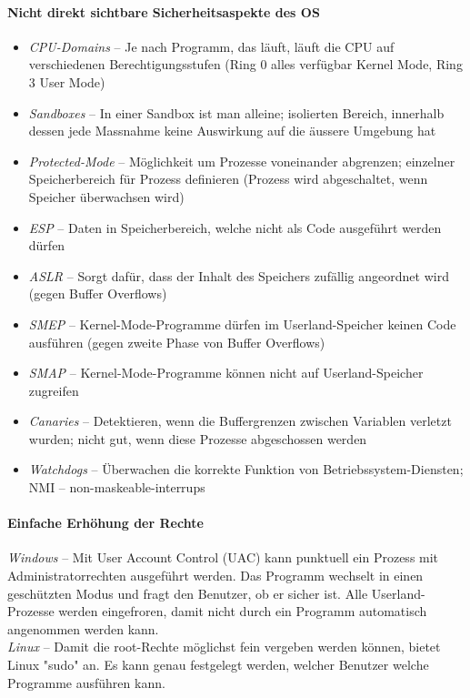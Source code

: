 \documentclass[a4paper,12pt]{article}
\begin{document}
\paragraph{Nicht direkt sichtbare Sicherheitsaspekte des OS}
\begin{itemize}
\item \emph{CPU-Domains} -- Je nach Programm, das läuft, läuft die CPU auf verschiedenen Berechtigungsstufen (Ring 0 alles verfügbar Kernel Mode, Ring 3 User Mode)
\item \emph{Sandboxes} -- In einer Sandbox ist man alleine; isolierten Bereich, innerhalb dessen jede Massnahme keine Auswirkung auf die äussere Umgebung hat
\item \emph{Protected-Mode} -- Möglichkeit um Prozesse voneinander abgrenzen; einzelner Speicherbereich für Prozess definieren (Prozess wird abgeschaltet, wenn Speicher überwachsen wird)
\item \emph{ESP} -- Daten in Speicherbereich, welche nicht als Code ausgeführt werden dürfen
\item \emph{ASLR} -- Sorgt dafür, dass der Inhalt des Speichers zufällig angeordnet wird (gegen Buffer Overflows)
\item \emph{SMEP} -- Kernel-Mode-Programme dürfen im Userland-Speicher keinen Code ausführen (gegen zweite Phase von Buffer Overflows)
\item \emph{SMAP} -- Kernel-Mode-Programme können nicht auf Userland-Speicher zugreifen
\item \emph{Canaries} -- Detektieren, wenn die Buffergrenzen zwischen Variablen verletzt wurden; nicht gut, wenn diese Prozesse abgeschossen werden
\item \emph{Watchdogs} -- Überwachen die korrekte Funktion von Betriebssystem-Diensten; NMI -- non-maskeable-interrups
\end{itemize}


\paragraph{Einfache Erhöhung der Rechte}
\emph{Windows} -- Mit User Account Control (UAC) kann punktuell ein Prozess mit Administratorrechten ausgeführt werden. Das Programm wechselt in einen geschützten Modus und fragt den Benutzer, ob er sicher ist. Alle Userland-Prozesse werden eingefroren, damit nicht durch ein Programm automatisch angenommen werden kann.\\

\emph{Linux} -- Damit die root-Rechte möglichst fein vergeben werden können, bietet Linux "sudo" an. Es kann genau festgelegt werden, welcher Benutzer welche Programme ausführen kann.
\end{document}
